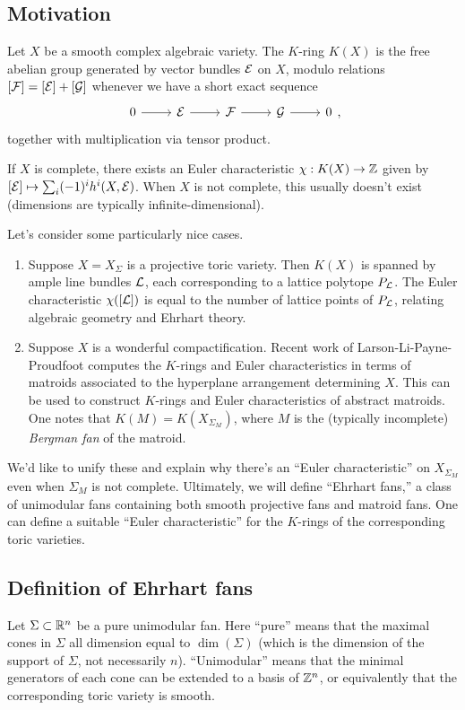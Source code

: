 \documentclass{amsart}
\begin{document}
\subsection{Motivation}

Let $X$ be a smooth complex algebraic variety.
The $K$-ring $K(X)$ is the free abelian group generated by vector bundles $\mathcal{E}$ on $X$, modulo relations $[\mathcal{F}] = [\mathcal{E}] + [\mathcal{G}]$ whenever we have a short exact sequence
\[
	\SES{\Ec}{\Fc}{\Gc},
\]
together with multiplication via tensor product.

If $X$ is complete, there exists an Euler characteristic $\chi: K(X) \to \mathbb{Z}$ given by $[\mathcal{E}] \mapsto \sum_i (-1)^i h^i(X, \mathcal{E})$.
When $X$ is not complete, this usually doesn't exist (dimensions are typically infinite-dimensional).

Let's consider some particularly nice cases.
\begin{enumerate}
	\item Suppose $X = X_\Sigma$ is a projective toric variety.
		Then $K(X)$ is spanned by ample line bundles $\mathcal{L}$, each corresponding to a lattice polytope $P_{\mathcal{L}}$.
		The Euler characteristic $\chi([\mathcal{L}])$ is equal to the number of lattice points of $P_{\mathcal{L}}$, relating algebraic geometry and Ehrhart theory.
	\item Suppose $X$ is a wonderful compactification.
		Recent work of Larson-Li-Payne-Proudfoot computes the $K$-rings and Euler characteristics in terms of matroids associated to the hyperplane arrangement determining $X$.
		This can be used to construct $K$-rings and Euler characteristics of abstract matroids.
		One notes that $K(M) = K(X_{\Sigma_M})$, where $M$ is the (typically incomplete) \emph{Bergman fan} of the matroid.
\end{enumerate}

We'd like to unify these and explain why there's an ``Euler characteristic'' on $X_{\Sigma_M}$ even when $\Sigma_M$ is not complete.
Ultimately, we will define ``Ehrhart fans,'' a class of unimodular fans containing both smooth projective fans and matroid fans.
One can define a suitable ``Euler characteristic'' for the $K$-rings of the corresponding toric varieties.

\subsection{Definition of Ehrhart fans}

Let $\Sigma \subset \mathbb{R}^n$ be a pure unimodular fan.
Here ``pure'' means that the maximal cones in $\Sigma$ all dimension equal to $\dim(\Sigma)$ (which is the dimension of the support of $\Sigma$, not necessarily $n$).
``Unimodular'' means that the minimal generators of each cone can be extended to a basis of $\mathbb{Z}^n$, or equivalently that the corresponding toric variety is smooth.
\end{document}
